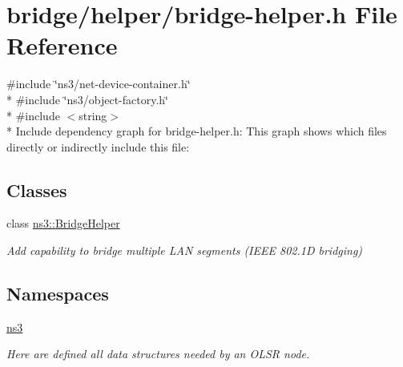 \hypertarget{bridge-helper_8h}{}\section{bridge/helper/bridge-\/helper.h File Reference}
\label{bridge-helper_8h}
{\ttfamily \#include \char`\"{}ns3/net-\/device-\/container.\+h\char`\"{}}\\*
{\ttfamily \#include \char`\"{}ns3/object-\/factory.\+h\char`\"{}}\\*
{\ttfamily \#include $<$string$>$}\\*
Include dependency graph for bridge-\/helper.h\+:
This graph shows which files directly or indirectly include this file\+:
\subsection*{Classes}
\begin{DoxyCompactItemize}
\item 
class \hyperlink{classns3_1_1BridgeHelper}{ns3\+::\+Bridge\+Helper}
\begin{DoxyCompactList}\small\item\em Add capability to bridge multiple L\+AN segments (I\+E\+EE 802.\+1D bridging) \end{DoxyCompactList}\end{DoxyCompactItemize}
\subsection*{Namespaces}
\begin{DoxyCompactItemize}
\item 
 \hyperlink{namespacens3}{ns3}
\begin{DoxyCompactList}\small\item\em Here are defined all data structures needed by an O\+L\+SR node. \end{DoxyCompactList}\end{DoxyCompactItemize}
